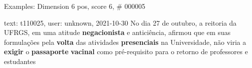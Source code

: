 \begin{frame}{Examples: Dimension 6 pos, score 6, \# 000005}
\footnotesize
\begin{exampleblock}{text: t110025, user: unknown, 2021-10-30}
No dia 27 de outubro, a reitoria da UFRGS, em uma atitude \textbf{negacionista} 
e anticiência, afirmou que em suas formulações pela \textbf{volta} das 
atividades \textbf{presenciais} na Universidade, não viria a \textbf{exigir} o 
\textbf{passaporte} \textbf{vacinal} como pré-requisito para o retorno de 
professores e estudantes 
\end{exampleblock}
\end{frame}
